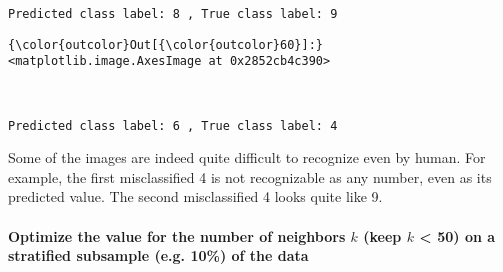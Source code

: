 \documentclass[11pt]{article}
\begin{document}
    \begin{Verbatim}[commandchars=\\\{\}]
Predicted class label: 8 , True class label: 9

    \end{Verbatim}

            \begin{Verbatim}[commandchars=\\\{\}]
{\color{outcolor}Out[{\color{outcolor}60}]:} <matplotlib.image.AxesImage at 0x2852cb4c390>
\end{Verbatim}
        
    \begin{center}
    \end{center}
    { \hspace*{\fill} \\}
    
    \begin{Verbatim}[commandchars=\\\{\}]
Predicted class label: 6 , True class label: 4

    \end{Verbatim}

    Some of the images are indeed quite difficult to recognize even by
human. For example, the first misclassified 4 is not recognizable as any
number, even as its predicted value. The second misclassified 4 looks
quite like 9.

    \paragraph{\texorpdfstring{Optimize the value for the number of
neighbors \(k\) (keep \(k\) \textless{} 50) on a stratified subsample
(e.g. 10\%) of the
data}{Optimize the value for the number of neighbors k (keep k \textless{} 50) on a stratified subsample (e.g. 10\%) of the data}}\label{optimize-the-value-for-the-number-of-neighbors-k-keep-k-50-on-a-stratified-subsample-e.g.-10-of-the-data}
\end{document}
